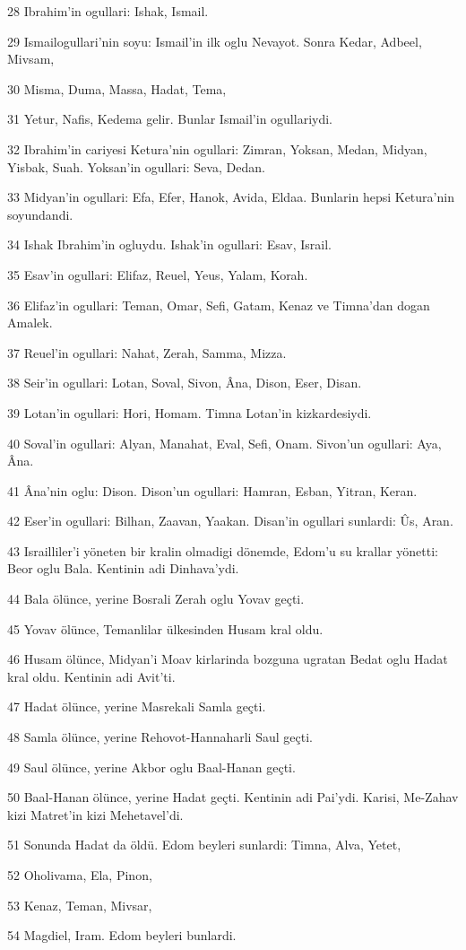 \par 28 Ibrahim'in ogullari: Ishak, Ismail.
\par 29 Ismailogullari'nin soyu: Ismail'in ilk oglu Nevayot. Sonra Kedar, Adbeel, Mivsam,
\par 30 Misma, Duma, Massa, Hadat, Tema,
\par 31 Yetur, Nafis, Kedema gelir. Bunlar Ismail'in ogullariydi.
\par 32 Ibrahim'in cariyesi Ketura'nin ogullari: Zimran, Yoksan, Medan, Midyan, Yisbak, Suah. Yoksan'in ogullari: Seva, Dedan.
\par 33 Midyan'in ogullari: Efa, Efer, Hanok, Avida, Eldaa. Bunlarin hepsi Ketura'nin soyundandi.
\par 34 Ishak Ibrahim'in ogluydu. Ishak'in ogullari: Esav, Israil.
\par 35 Esav'in ogullari: Elifaz, Reuel, Yeus, Yalam, Korah.
\par 36 Elifaz'in ogullari: Teman, Omar, Sefi, Gatam, Kenaz ve Timna'dan dogan Amalek.
\par 37 Reuel'in ogullari: Nahat, Zerah, Samma, Mizza.
\par 38 Seir'in ogullari: Lotan, Soval, Sivon, Âna, Dison, Eser, Disan.
\par 39 Lotan'in ogullari: Hori, Homam. Timna Lotan'in kizkardesiydi.
\par 40 Soval'in ogullari: Alyan, Manahat, Eval, Sefi, Onam. Sivon'un ogullari: Aya, Âna.
\par 41 Âna'nin oglu: Dison. Dison'un ogullari: Hamran, Esban, Yitran, Keran.
\par 42 Eser'in ogullari: Bilhan, Zaavan, Yaakan. Disan'in ogullari sunlardi: Ûs, Aran.
\par 43 Israilliler'i yöneten bir kralin olmadigi dönemde, Edom'u su krallar yönetti: Beor oglu Bala. Kentinin adi Dinhava'ydi.
\par 44 Bala ölünce, yerine Bosrali Zerah oglu Yovav geçti.
\par 45 Yovav ölünce, Temanlilar ülkesinden Husam kral oldu.
\par 46 Husam ölünce, Midyan'i Moav kirlarinda bozguna ugratan Bedat oglu Hadat kral oldu. Kentinin adi Avit'ti.
\par 47 Hadat ölünce, yerine Masrekali Samla geçti.
\par 48 Samla ölünce, yerine Rehovot-Hannaharli Saul geçti.
\par 49 Saul ölünce, yerine Akbor oglu Baal-Hanan geçti.
\par 50 Baal-Hanan ölünce, yerine Hadat geçti. Kentinin adi Pai'ydi. Karisi, Me-Zahav kizi Matret'in kizi Mehetavel'di.
\par 51 Sonunda Hadat da öldü. Edom beyleri sunlardi: Timna, Alva, Yetet,
\par 52 Oholivama, Ela, Pinon,
\par 53 Kenaz, Teman, Mivsar,
\par 54 Magdiel, Iram. Edom beyleri bunlardi.

